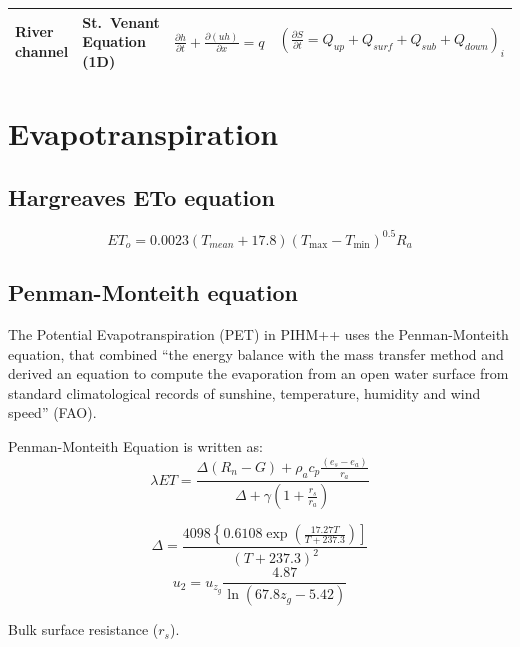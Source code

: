 \documentclass[]{scrbook}
\begin{document}
\begin{longtable}[]{@{}llll@{}}
\begin{minipage}[t]{0.12\columnwidth}
River channel\strut
\end{minipage} & \begin{minipage}[t]{0.12\columnwidth}\raggedright\strut
St.~Venant Equation (1D)\strut
\end{minipage} & \begin{minipage}[t]{0.31\columnwidth}\raggedright\strut
\(\frac{\partial h}{\partial t}+\frac{\partial(u h)}{\partial x}=q\)\strut
\end{minipage} & \begin{minipage}[t]{0.31\columnwidth}\raggedright\strut
\(\left(\frac{\partial S}{\partial t} = Q_{up} + Q_{surf} + Q_{sub} + Q_{down} \right)_{i}\)\strut
\end{minipage}\tabularnewline
\bottomrule
\end{longtable}

\chapter{Evapotranspiration}\label{ET}

\section{Hargreaves ETo equation}\label{hargreaves-eto-equation}

\[ {ET}_{{o}}=0.0023\left({T}_{{mean}}+17.8\right)\left({T}_{\max }-{T}_{\min }\right)^{0.5} {R}_{{a}} \]

\section{Penman-Monteith equation}\label{penman-monteith-equation}

The Potential Evapotranspiration (PET) in PIHM++ uses the
Penman-Monteith equation, that combined ``the energy balance with the
mass transfer method and derived an equation to compute the evaporation
from an open water surface from standard climatological records of
sunshine, temperature, humidity and wind speed'' (FAO).

Penman-Monteith Equation is written as:
\[    \lambda ET =  \frac{\Delta (R_n - G) + \rho_a c_p \frac{(e_s -e_a)}{r_a}} {\Delta + \gamma (1+\frac{r_s}{r_a})} \]

\[ \Delta=\frac{4098\left\{0.6108 \exp \left(\frac{17.27 T}{T+237.3}\right)\right]}{(T+237.3)^{2}} \]
\[u_{2}=u_{z_g} \frac{4.87}{\ln (67.8 z_g-5.42)}\]

Bulk surface resistance (\(r_s\)).
\end{document}
